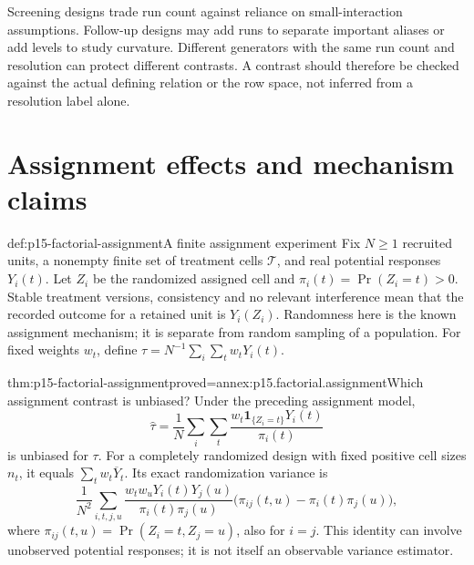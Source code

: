 Screening designs trade run count against reliance on small-interaction
assumptions. Follow-up designs may add runs to separate important aliases
or add levels to study curvature. Different generators with the same run
count and resolution can protect different contrasts. A contrast should
therefore be checked against the actual defining relation or the row space,
not inferred from a resolution label alone.

\section{Assignment effects and mechanism claims}
\label{sec:p15-factorial-causal}

\begin{hbdefinition}{def:p15-factorial-assignment}{A finite assignment experiment}
Fix \(N\geq1\) recruited units, a nonempty finite set of treatment cells
\(\mathcal T\), and real potential responses \(Y_i(t)\).
Let \(Z_i\) be the randomized assigned
cell and \(\pi_i(t)=\Pr(Z_i=t)>0\). Stable treatment versions,
consistency and no relevant interference mean that the recorded outcome
for a retained unit is \(Y_i(Z_i)\). Randomness here is the known
assignment mechanism; it is separate from random sampling of a population.
For fixed weights \(w_t\), define
\(\tau=N^{-1}\sum_i\sum_tw_tY_i(t)\).
\end{hbdefinition}

\begin{hbtheorem}{thm:p15-factorial-assignment}{proved=annex:p15.factorial.assignment}{Which assignment contrast is unbiased?}
Under the preceding assignment model,
\[
 \widehat\tau=\frac1N\sum_i\sum_t
  \frac{w_t\mathbf1_{\{Z_i=t\}}Y_i(t)}{\pi_i(t)}
\]
is unbiased for \(\tau\). For a completely randomized design with fixed
positive cell sizes \(n_t\), it equals \(\sum_tw_t\overline Y_t\).
Its exact randomization variance is
\[
 \frac1{N^2}\sum_{i,t,j,u}
 \frac{w_tw_uY_i(t)Y_j(u)}{\pi_i(t)\pi_j(u)}
 \bigl(\pi_{ij}(t,u)-\pi_i(t)\pi_j(u)\bigr),
\]
where \(\pi_{ij}(t,u)=\Pr(Z_i=t,Z_j=u)\), also for \(i=j\).
This identity can involve unobserved potential responses; it is not itself
an observable variance estimator.
\end{hbtheorem}

